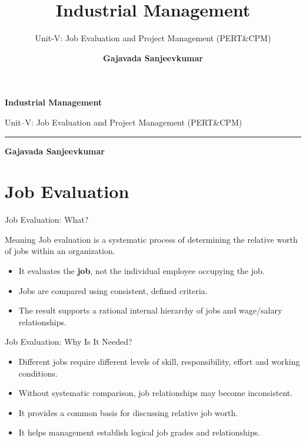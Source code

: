 \documentclass[aspectratio=169,10pt]{beamer}
\title{Industrial Management}
\subtitle{Unit-V: Job Evaluation and Project Management (PERT\&CPM)}
\author{
    \textbf{Gajavada Sanjeevkumar}
}
\date{}
\begin{document}
\begin{frame}[plain]
\vspace{1.35cm}

{\color{black}\bfseries\LARGE Industrial Management\par}

\vspace{0.32cm}

{\large Unit--V: Job Evaluation and Project Management (PERT\&CPM)\par}

\vspace{0.28cm}

{\color{Orange}\rule{\textwidth}{1.4pt}\par}

\vfill

{\large\textbf{Gajavada Sanjeevkumar}\par}

\vspace{0.7cm}

\end{frame}



\section{Job Evaluation}

\begin{frame}{Job Evaluation: What?}
\begin{block}{Meaning}
Job evaluation is a systematic process of determining the relative worth of jobs within an organization.
\end{block}
\begin{itemize}
  \item It evaluates the \textbf{job}, not the individual employee occupying the job.
  \item Jobs are compared using consistent, defined criteria.
  \item The result supports a rational internal hierarchy of jobs and wage/salary relationships.
\end{itemize}
\end{frame}

\begin{frame}{Job Evaluation: Why Is It Needed?}
\begin{itemize}
  \item Different jobs require different levels of skill, responsibility, effort and working conditions.
  \item Without systematic comparison, job relationships may become inconsistent.
  \item It provides a common basis for discussing relative job worth.
  \item It helps management establish logical job grades and relationships.
\end{itemize}
\end{frame}
\end{document}
